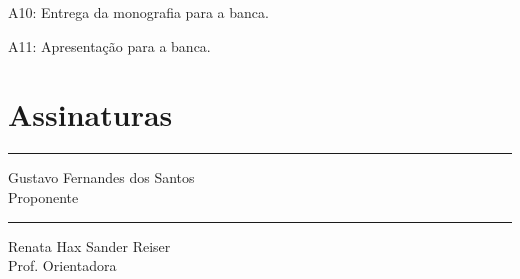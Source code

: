 \documentclass[tcc-proposta]{texufpel}
\begin{document}
A10: Entrega da monografia para a banca.

A11: Apresentação para a banca.
	
	


	
\chapter{Assinaturas}
\vspace{2cm}
	
\begin{center}
\rule{8cm}{.3mm}
\medskip
	
	Gustavo Fernandes dos Santos\\
	Proponente
	
\end{center}
	
\vspace{4cm}
	
\begin{center}
\rule{8cm}{.3mm}
\medskip
	
	Renata Hax Sander Reiser\\
	Prof. Orientadora
	
\end{center}
\end{document}
